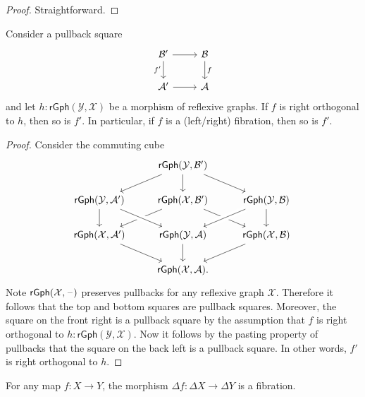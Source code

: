 \begin{proof}
Straightforward.
\end{proof}

\begin{prp}
Consider a pullback square
\begin{equation*}
\begin{tikzcd}
\mathcal{B}' \arrow[r] \arrow[d,swap,"{f'}"] & \mathcal{B} \arrow[d,"f"] \\
\mathcal{A}' \arrow[r] & \mathcal{A}
\end{tikzcd}
\end{equation*}
and let $h:\mathsf{rGph}(\mathcal{Y},\mathcal{X})$ be a morphism of reflexive graphs. If $f$ is right orthogonal to $h$, then so is $f'$. In particular, if $f$ is a (left/right) fibration, then so is $f'$. 
\end{prp}

\begin{proof}
Consider the commuting cube
\begin{equation*}
\begin{tikzcd}
& \mathsf{rGph}(\mathcal{Y},\mathcal{B}') \arrow[dl] \arrow[d] \arrow[dr] \\
\mathsf{rGph}(\mathcal{Y},\mathcal{A}') \arrow[d] & \mathsf{rGph}(\mathcal{X},\mathcal{B}') \arrow[dl] \arrow[dr] & \mathsf{rGph}(\mathcal{Y},\mathcal{B}) \arrow[dl,crossing over] \arrow[d] \\
\mathsf{rGph}(\mathcal{X},\mathcal{A}') \arrow[dr] & \mathsf{rGph}(\mathcal{Y},\mathcal{A}) \arrow[from=ul,crossing over] \arrow[d] & \mathsf{rGph}(\mathcal{X},\mathcal{B}) \arrow[dl] \\
& \mathsf{rGph}(\mathcal{X},\mathcal{A}). & \phantom{\mathsf{rGph}(\mathcal{X},\mathcal{A}')}
\end{tikzcd}
\end{equation*}
Note $\mathsf{rGph}(\mathcal{X},\mathord{\hspace{1pt}\text{--}\hspace{1pt}})$ preserves pullbacks for any reflexive graph $\mathcal{X}$. Therefore it follows that the top and bottom squares are pullback squares. Moreover, the square on the front right is a pullback square by the assumption that $f$ is right orthogonal to $h:\mathsf{rGph}(\mathcal{Y},\mathcal{X})$. Now it follows by the pasting property of pullbacks that the square on the back left is a pullback square. In other words, $f'$ is right orthogonal to $h$. 
\end{proof}

\begin{prp}
For any map $f:X\to Y$, the morphism $\Delta f : \Delta X \to \Delta Y$ is a fibration.
\end{prp}

